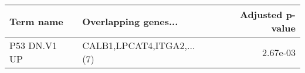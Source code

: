 \begin{tabular}{llr}
\toprule
   Term name &      Overlapping genes... &  Adjusted p-value \\
\midrule
P53 DN.V1 UP & CALB1,LPCAT4,ITGA2,...(7) &          2.67e-03 \\
\bottomrule
\end{tabular}
